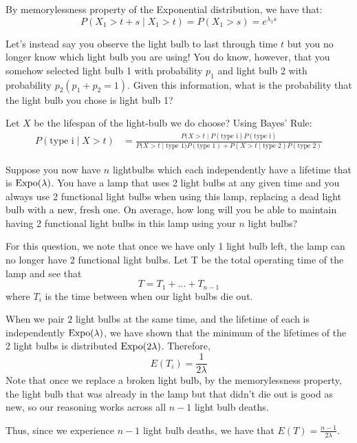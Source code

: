 \documentclass[11pt]{article}
\begin{document}
\begin{solution}
By memorylessness property of the Exponential distribution, we have that:
$$
P(X_1 > t + s \mid X_1 > t) = P(X_1 > s) = e^{\lambda_1 s}
$$
\end{solution}

\begin{exercise}
Let's instead say you observe the light bulb to last through time $t$ but you no longer know which light bulb you are using! You do know, however, that you somehow selected light bulb 1 with probability $p_1$ and light bulb 2 with probability $p_2 (p_1 + p_2 = 1)$. Given this information, what is the probability that the light bulb you chose is light bulb 1?
\end{exercise}


\begin{solution}
Let $X$ be the lifespan of the light-bulb we do choose? Using Bayes' Rule:
\begin{align}
P(\text{type i} \mid X > t) &= \frac{P(X > t \mid P(\text{type i})P(\text{type i})}{P(X > t \mid \text{type 1)}P(\text{type 1}) + P(X > t \mid \text{type 2})P(\text{type 2})}
\end{align}
\end{solution}

\begin{exercise}
Suppose you now have $n$ lightbulbs which each independently have a lifetime that is $\textrm{Expo}(\lambda)$. You have a lamp that uses 2 light bulbs at any given time and you always use 2 functional light bulbs when using this lamp, replacing a dead light bulb with a new, fresh one. On average, how long will you be able to maintain having 2 functional light bulbs in this lamp using your $n$ light bulbs?
\end{exercise}
\begin{solution}
For this question, we note that once we have only 1 light bulb left, the lamp can no longer have 2 functional light bulbs. Let T be the total operating time of the lamp and see that
$$
T = T_1 + ... + T_{n-1}
$$
where $T_i$ is the time between when our light bulbs die out.

When we pair $2$ light bulbs at the same time, and the lifetime of each is independently $\textrm{Expo}(\lambda)$, we have shown that the minimum of the lifetimes of the 2 light bulbs is distributed $\textrm{Expo}(2\lambda)$.
Therefore,
$$
E(T_i) = \frac{1}{2 \lambda}
$$
Note that once we replace a broken light bulb, by the memorylessness property, the light bulb that was already in the lamp but that didn't die out is good as new, so our reasoning works across all $n - 1$ light bulb deaths.

Thus, since we experience $n - 1$ light bulb deaths, we have that $E(T) = \frac{n - 1}{2\lambda}$.
\end{solution}
\end{document}

